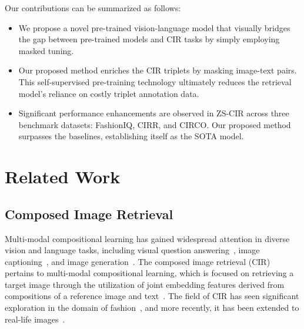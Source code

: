 \documentclass[10pt,twocolumn,letterpaper]{article}
\begin{document}
Our contributions can be summarized as follows:
\begin{itemize}
    \item We propose a novel pre-trained vision-language model that visually bridges the gap between pre-trained models and CIR tasks by simply employing masked tuning.
    \item Our proposed method enriches the CIR triplets by masking image-text pairs. This self-supervised pre-training technology ultimately reduces the retrieval model's reliance on costly triplet annotation data.
    \item Significant performance enhancements are observed in ZS-CIR across three benchmark datasets: FashionIQ, CIRR, and CIRCO. Our proposed method surpasses the baselines, establishing itself as the SOTA model.
\end{itemize}

\section{Related Work}
\subsection{Composed Image Retrieval}
Multi-modal compositional learning has gained widespread attention in diverse vision and language tasks, including visual question answering~\cite{li2021align}, image captioning~\cite{hu2022scaling}, and image generation~\cite{rombach2022high}. The composed image retrieval (CIR) pertains to multi-modal compositional learning, which is focused on retrieving a target image through the utilization of joint embedding features derived from compositions of a reference image and text~\cite{vo2019composing}. The field of CIR has seen significant exploration in the domain of fashion~\cite{wu2021fashion}, and more recently, it has been extended to real-life images~\cite{liu2021image}. 
\end{document}

